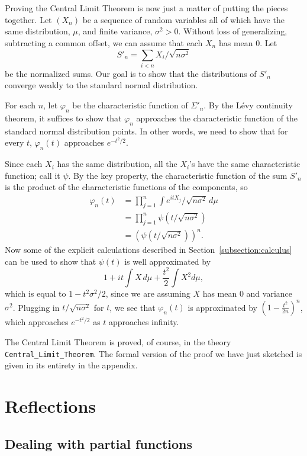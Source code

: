 \documentclass{svjour3}
\newcommand{\ph}{\varphi}
\begin{document}
Proving the Central Limit Theorem is now just a matter of putting the pieces together. Let $(X_n)$ be a sequence of random variables all of which have the same distribution, $\mu$, and finite variance, $\sigma^2 > 0$. Without loss of generalizing, subtracting a common offset, we can assume that each $X_n$ has mean $0$. Let
\[
 S'_n = \sum_{i < n} X_i / \sqrt {n \sigma^2}
\]
be the normalized sums. Our goal is to show that the distributions of $S'_n$ converge weakly to the standard normal distribution. 

For each $n$, let $\ph_n$ be the characteristic function of $\Sigma'_n$. By the L\'evy continuity theorem, it suffices to show that $\ph_n$ approaches the characteristic function of the standard normal distribution points. In other words, we need to show that for every $t$, $\ph_n(t)$ approaches $e^{-t^2/2}$.

Since each $X_i$ has the same distribution, all the $X_i$'s have the same characteristic function; call it $\psi$. By the key property, the characteristic function of the sum $S'_n$ is the product of the characteristic functions of the components, so
\begin{align*}
 \ph_n(t) & = \prod_{j = 1}^n \int e^{itX_j} / \sqrt{n \sigma^2} \, d\mu \\
   & = \prod_{j = 1}^n \psi(t / \sqrt{n \sigma^2}) \\
   & = (\psi(t / \sqrt{n \sigma^2}))^n.
\end{align*}
Now some of the explicit calculations described in Section~\ref{subsection:calculus} can be used to show that $\psi(t)$ is well approximated by
\[
1 + it \int X \, d\mu + \frac{t^2}{2} \int X^2 d\mu, 
\]
which is equal to $1 - t^2\sigma^2 / 2$, since we are assuming $X$ has mean $0$ and variance $\sigma^2$. Plugging in $t / \sqrt{n \sigma^2}$ for $t$, we see that $\ph_n(t)$ is approximated by $(1 - \frac{t^2}{2n})^n$, which approaches $e^{-t^2/2}$ as $t$ approaches infinity.

The Central Limit Theorem is proved, of course, in the theory \verb=Central_Limit_Theorem=. The formal version of the proof we have just sketched is given in its entirety in the appendix. 

\section{Reflections}
\label{section:reflections}

\subsection{Dealing with partial functions}
\end{document}
